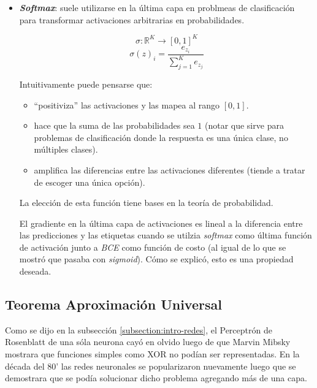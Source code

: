 \begin{itemize}
    \item \textit{\textbf{ Softmax}}: suele utilizarse en la última capa en problmeas de clasificación para transformar activaciones arbitrarias en probabilidades.
    
    \begin{equation*}
        \sigma : \mathbb{R}^K \rightarrow [0,1]^K
    \end{equation*}
    \begin{equation*}
        \sigma(z)_i = \frac{e_{z_i}}{\sum_{j=1}^K e_{z_j}}
    \end{equation*}
    
    Intuitivamente puede pensarse que:
    \begin{itemize}
        \item ``positiviza'' las activaciones y las mapea al rango $[0,1]$.
        \item  hace que la suma de las probabilidades sea $1$ (notar que sirve para problemas de clasificación donde la respuesta es una única clase, no múltiples clases).
        \item amplifica las diferencias entre las activaciones diferentes (tiende a tratar de escoger una única opción).
    \end{itemize}
    
    La elección de esta función tiene bases en la teoría de probabilidad. 
    
    El gradiente en la última capa de activaciones es lineal a la diferencia entre las predicciones y las etiquetas cuando se utilzia \textit{softmax} como última función de activación junto a \textit{BCE} como función de costo (al igual de lo que se mostró que pasaba con \textit{sigmoid}). Cómo se explicó, esto es una propiedad deseada.
    
\end{itemize}

\subsection{Teorema Aproximación Universal}

Como se dijo en la subsección \ref{subsection:intro-redes}, el Perceptrón de Rosenblatt de una sóla neurona cayó en olvido luego de que Marvin Mibsky mostrara que funciones simples como XOR no podían ser representadas. En la década del 80' las redes neuronales se popularizaron nuevamente luego que se demostrara que se podía solucionar dicho problema agregando más de una capa.

